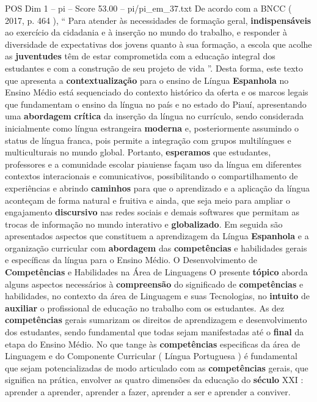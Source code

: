 \begin{textsample}{POS Dim 1 – pi – Score 53.00 – pi/pi\_em\_37.txt}
De acordo com a BNCC ( 2017, p. 464 ), “ Para atender às necessidades de formação geral, \textbf{indispensáveis} ao exercício da cidadania e à inserção no mundo do trabalho, e responder à diversidade de expectativas dos jovens quanto à sua formação, a escola que acolhe as \textbf{juventudes} têm de estar comprometida com a educação integral dos estudantes e com a construção de seu projeto de vida ”.
Desta forma, este texto que apresenta a \textbf{contextualização} para o ensino de Língua \textbf{Espanhola} no Ensino Médio está sequenciado do contexto histórico da oferta e os marcos legais que fundamentam o ensino da língua no país e no estado do Piauí, apresentando uma \textbf{abordagem} \textbf{crítica} da inserção da língua no currículo, sendo considerada inicialmente como língua estrangeira \textbf{moderna} e, posteriormente assumindo o status de língua franca, pois permite a integração com grupos multilíngues e multiculturais no mundo global.
Portanto, \textbf{esperamos} que estudantes, professores e a comunidade escolar piauiense façam uso da língua em diferentes contextos interacionais e comunicativos, possibilitando o compartilhamento de experiências e abrindo \textbf{caminhos} para que o aprendizado e a aplicação da língua aconteçam de forma natural e fruitiva e ainda, que seja meio para ampliar o engajamento \textbf{discursivo} nas redes sociais e demais softwares que permitam as trocas de informação no mundo interativo e \textbf{globalizado}.
Em seguida são apresentados aspectos que constituem a aprendizagem da Língua \textbf{Espanhola} e a organização curricular com \textbf{abordagem} das \textbf{competências} e habilidades gerais e específicas da língua para o Ensino Médio.
O Desenvolvimento de \textbf{Competências} e Habilidades na Área de Linguagens O presente \textbf{tópico} aborda alguns aspectos necessários à \textbf{compreensão} do significado de \textbf{competências} e habilidades, no contexto da área de Linguagem e suas Tecnologias, no \textbf{intuito} de \textbf{auxiliar} o profissional de educação no trabalho com os estudantes.
As dez \textbf{competências} gerais sumarizam os direitos de aprendizagem e desenvolvimento dos estudantes, sendo fundamental que todas sejam manifestadas até o \textbf{final} da etapa do Ensino Médio.
No que tange às \textbf{competências} especificas da área de Linguagem e do Componente Curricular ( Língua Portuguesa ) é fundamental que sejam potencializadas de modo articulado com as \textbf{competências} gerais, que significa na prática, envolver as quatro dimensões da educação do \textbf{século} XXI : aprender a aprender, aprender a fazer, aprender a ser e aprender a conviver.

\end{textsample}
